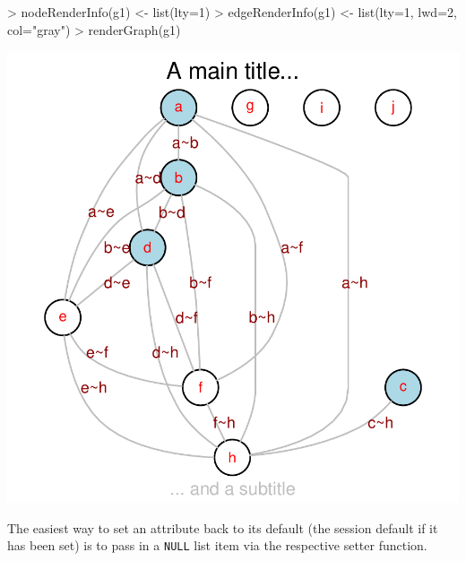 \documentclass{article}
\newcommand{\Robject}[1]{{\texttt{#1}}}
\begin{document}
\begin{Schunk}
\begin{Sinput}
> nodeRenderInfo(g1) <- list(lty=1)
> edgeRenderInfo(g1) <- list(lty=1, lwd=2, col="gray")
> renderGraph(g1)
\end{Sinput}
\end{Schunk}
\includegraphics{newRgraphvizInterface-setallatonce}

The easiest way to set an attribute back to its default (the session
default if it has been set) is to pass in a \Robject{NULL} list item
via the respective setter function.
\end{document}
